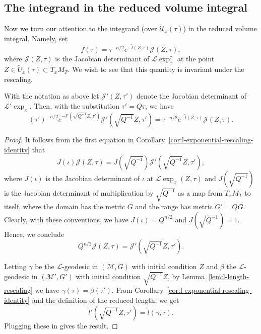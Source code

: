 \subsection{The integrand in the reduced volume integral}


Now we turn our attention to the integrand (over $\widetilde {\mathcal U}_x(\tau)$) in the
reduced volume integral. Namely, set
$$f(\tau)=\tau^{-n/2}e^{-\tilde l(Z,\tau)}{\mathcal J}(Z,\tau),$$
where ${\mathcal J}(Z,\tau)$ is the Jacobian
determinant of ${\mathcal L}\exp_x^\tau$ at the point $Z\in \widetilde
U_x(\tau)\subset T_xM_T$. We wish to see that this quantity is invariant under
the rescaling.

\begin{lemma}\label{lem:reduced-volume-integrand-scale-invariance}
\label{Qformula}
With the notation as above let ${\mathcal J}'(Z,\tau')$ denote the
Jacobian determinant of  ${\mathcal L}'\exp_x$. Then, with the
substitution $\tau'=Q\tau$, we have
$$(\tau')^{-n/2}e^{-\tilde l'(\sqrt{Q^{-1}}Z,\tau')}{\mathcal J}'(\sqrt{Q^{-1}}Z,\tau')=
\tau^{-n/2}e^{-\tilde l(Z,\tau)}{\mathcal J}(Z,\tau).$$
\end{lemma}


\begin{proof}
It follows from the first equation in Corollary~\ref{cor:l-exponential-rescaling-identity} that
$$J(\iota){\mathcal J}(Z,\tau)=J(\sqrt{Q^{-1}}){\mathcal
J}'(\sqrt{Q^{-1}}Z,\tau'),$$ where $J(\iota)$ is the Jacobian
determinant of $\iota$ at ${\mathcal L}\exp_x(Z,\tau)$ and
$J(\sqrt{Q^{-1}})$ is the Jacobian determinant of multiplication by
$\sqrt{Q^{-1}}$ as a map from $T_xM_T$ to itself, where the domain
has the metric $G$ and the range has metric $G'=QG$. Clearly, with
these conventions, we have $J(\iota)=Q^{n/2}$ and
$J(\sqrt{Q^{-1}})=1$. Hence, we conclude
$$Q^{n/2}{\mathcal J}(Z,\tau)={\mathcal J}'(\sqrt{Q^{-1}}Z,\tau').$$

Letting $\gamma$ be the ${\mathcal L}$-geodesic in $({\mathcal
M},G)$ with initial condition $Z$ and $\beta$ the ${\mathcal
L}$-geodesic in $({\mathcal M}',G')$ with initial condition
$\sqrt{Q^{-1}}Z$,  by Lemma~\ref{lem:l-length-rescaling} we have
$\gamma(\tau)=\beta(\tau')$. From Corollary~\ref{cor:l-exponential-rescaling-identity} and the
definition of the reduced length, we get $$\tilde
l'(\sqrt{Q^{-1}}Z,\tau')=\tilde l(\gamma,\tau).$$ Plugging these in
gives the result.
\end{proof}

